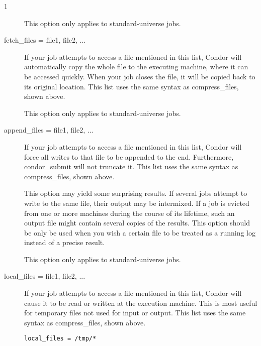 \begin{ManPage}{\label{man-condor-submit}}{1}
\begin{description}
This option only applies to standard-universe jobs.


\item[fetch\_files = file1, file2, ...]

If your job attempts to access a file mentioned in this list,
Condor will automatically copy the whole file to the executing machine,
where it can be accessed quickly.  When your job closes the file,
it will be copied back to its original location.
This list uses the same syntax as compress\_files, shown above.

This option only applies to standard-universe jobs.


\item[append\_files = file1, file2, ...]

If your job attempts to access a file mentioned in this list,
Condor will force all writes to that file to be appended to the end.
Furthermore, condor\_submit will not truncate it.
This list uses the same syntax as compress\_files, shown above.

This option may yield some surprising results.  If several
jobs attempt to write to the same file, their output may be intermixed.
If a job is evicted from one or more machines during the course of its
lifetime, such an output file might contain several copies of the results.
This option should be only be used when you wish a certain file to be
treated as a running log instead of a precise result.

This option only applies to standard-universe jobs.


\item[local\_files = file1, file2, ...]

If your job attempts to access a file mentioned in this list,
Condor will cause it to be read or written at the execution machine.
This is most useful for temporary files not used for input or output.
This list uses the same syntax as compress\_files, shown above.

\begin{verbatim}
local_files = /tmp/*
\end{verbatim}


\end{description}
\end{ManPage}

